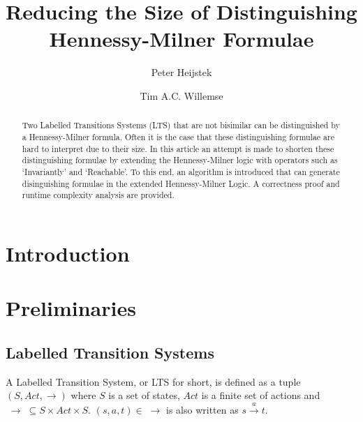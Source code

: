 \documentclass[runningheads]{llncs}
\begin{document}
%
\title{Reducing the Size of Distinguishing Hennessy-Milner Formulae}
%
%
\author{Peter Heijstek \and
Tim A.C. Willemse}

%
%
\maketitle              %
%
\begin{abstract}
    Two Labelled Transitions Systems (LTS) that are not bisimilar can be distinguished by a Hennessy-Milner formula. Often it is the case that these distinguishing formulae are hard to interpret due to their size. In this article an attempt is made to shorten these distinguishing formulae by extending the Hennessy-Milner logic with operators such as `Invariantly' and `Reachable'. To this end, an algorithm is introduced that can generate disinguishing formulae in the extended Hennessy-Milner Logic. A correctness proof and runtime complexity analysis are provided.

\end{abstract}

\section{Introduction}


\section{Preliminaries}
\subsection{Labelled Transition Systems}
%
%
%
A Labelled Transition System, or LTS for short, is defined as a tuple $(S, Act, \rightarrow)$ where $S$ is a set of states, $Act$ is a finite set of actions and $\;\rightarrow\; \subseteq S \times Act \times S$. $(s, a, t) \in \;\rightarrow$ is also written as $s \xrightarrow{a} t$.
\end{document}
